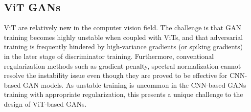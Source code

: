 \subsection*{ViT GANs}
ViT are relatively new in the computer vision field. The challenge is that GAN training becomes highly unstable when coupled with ViTs, and that adversarial training is frequently hindered by high-variance gradients (or spiking gradients) \cite{bai2021transformers} in the later stage of discriminator training. Furthermore, conventional regularization methods such as gradient penalty, spectral normalization cannot resolve the instability issue even though they are proved to be effective for CNN-based GAN models. As unstable training is uncommon in the CNN-based GANs training with appropriate regularization, this presents a unique challenge to the design of ViT-based GANs.
